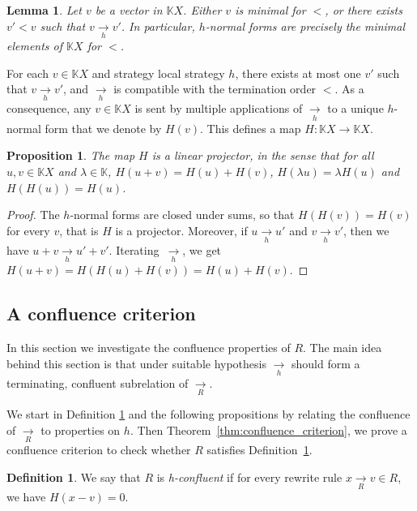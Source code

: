 \documentclass[10pt]{easychair}
\newtheorem{lemma}[theorem]{Lemma}
\newtheorem{proposition}[theorem]{Proposition}
\theoremstyle{definition}
\newtheorem{definition}[theorem]{Definition}
\newcommand\K{\mathbb{K}}
\newcommand\KX{\K X}
\newcommand\rewR{\underset{R}{\longrightarrow}}
\newcommand\rewh{\underset{h}{\longrightarrow}}
\begin{document}
\begin{lemma}\label{lem:h_normal_forms}
  Let $v$ be a vector in $\KX$. Either $v$ is minimal for $<$, or there exists $v'<v$ such that $v\rewh v'$. In particular, $h$-normal forms are
  precisely the minimal elements of $\KX$ for $<$. 
\end{lemma}

\medskip

For each $v\in\KX$ and strategy local strategy $h$, there exists at most one $v'$ such that $v \rewh v'$,
and $\rewh$ is compatible with the termination order $<$. As a
consequence, any $v \in \KX$ is sent by multiple applications of $\rewh$
to a unique $h$-normal form that we denote by $H(v)$. This defines a map
$H : \KX \to \KX$.  

\begin{proposition}\label{prop:linearity_of_H}
  The map $H$ is a linear projector, in the sense that for all $u,v \in \KX$ and $\lambda \in \K$, $H(u+v) = H(u) + H(v)$, $H(\lambda u) = \lambda H(u)$ and
  $H(H(u)) = H(u)$.
\end{proposition}

\begin{proof}
  The $h$-normal forms are closed under sums, so that $H(H(v))=H(v)$ for
  every $v$, that is $H$ is a projector. Moreover, if $u \rewh u'$ and
  $v \rewh v'$, then we have $u + v \rewh u' + v'$. Iterating~$\rewh$, we
  get $H(u + v) = H (H(u)+H(v))=H(u)+H(v)$. 
\end{proof}

\subsection{A confluence criterion}

In this section we investigate the confluence properties of $R$.
The main idea behind this section is that under suitable hypothesis $\rewh$ should form a terminating, confluent subrelation of $\rewR$.

We start in Definition \ref{def:standardisation_property} and the following propositions by relating the confluence of $\rewR$ to properties on $h$.
Then Theorem~\ref{thm:confluence_criterion}, we prove a confluence
criterion to check whether $R$ satisfies Definition~\ref{def:standardisation_property}.

\begin{definition}\label{def:standardisation_property}
  We say that $R$ is \emph{h-confluent} if for every rewrite rule $x\rewR v\in R$, we have $H(x-v) = 0$.
\end{definition}
\end{document}
